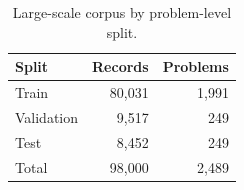 \begin{table}[t]
\centering
\caption{Large-scale corpus by problem-level split.}
\label{tab:dataset-splits}
\begin{tabular}{lrr}
\toprule
Split & Records & Problems \\
\midrule
Train & 80,031 & 1,991 \\
Validation & 9,517 & 249 \\
Test & 8,452 & 249 \\
Total & 98,000 & 2,489 \\
\bottomrule
\end{tabular}
\end{table}
